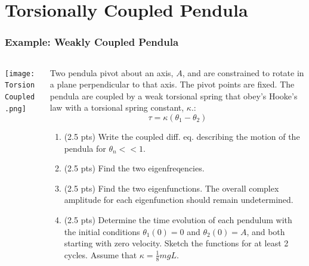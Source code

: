 \documentclass[pdf,handout, hideothersubsections]{beamer}
\begin{document}
\section{Torsionally Coupled Pendula}
\begin{frame}
\frametitle{Example: Weakly Coupled Pendula}

\begin{columns}
  \begin{column}{0.3\textwidth}
    \texttt{[image: TorsionCoupled.png]}
  \end{column}
  \pause

\begingroup
\footnotesize
  \begin{column}{0.7\textwidth}
Two pendula pivot about an axis, $A$, and are constrained to rotate in
a plane perpendicular to that axis. The pivot points are fixed. The
pendula are coupled by a weak torsional spring that obey's Hooke's law
with a torsional spring constant, $\kappa$.:
\begin{equation*}
\tau = \kappa (\theta_1 - \theta_2)
\end{equation*}
\pause

\begin{enumerate}
\item (2.5 pts) Write the coupled diff. eq. describing the motion of
  the pendula for $\theta_n << 1$.

\item (2.5 pts) Find the two eigenfreqencies.

\item (2.5 pts) Find the two eigenfunctions. The overall complex
  amplitude for each eigenfunction should remain undetermined.

\item (2.5 pts) Determine the time evolution of each pendulum with the
  initial conditions $\theta_1(0) = 0$ and $\theta_2(0) = A$, and both
  starting with zero velocity. Sketch the functions for at least 2
  cycles. Assume that $\kappa = \frac{1}{8} m g L$.

\end{enumerate}

\end{column}
\endgroup
\end{columns}
\end{frame}
\end{document}
